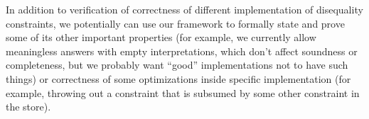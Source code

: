 \documentclass[submission,copyright,creativecommons]{eptcs}
\begin{document}
In addition to verification of correctness of different implementation of disequality constraints, we potentially can use our framework to formally
state and prove some of its other important properties (for example, we currently allow meaningless answers with empty interpretations, which don't
affect soundness or completeness, but we probably want ``good'' implementations not to have such things) or correctness of some optimizations inside
specific implementation (for example, throwing out a constraint that is subsumed by some other constraint in the store).



\end{document}
